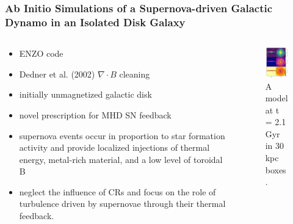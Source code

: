 \documentclass[10pt,aspectratio=169]{beamer}
\begin{document}
\begin{frame}
	\frametitle{Ab Initio Simulations of a Supernova-driven Galactic Dynamo in an Isolated Disk Galaxy \citep{2017ApJ...843..113B}}
		\begin{columns}
			\begin{column}{0.55\textwidth}
				\begin{itemize}
					\item ENZO code
					\item Dedner et al. (2002) $\nabla \cdot B$ cleaning
					\item initially unmagnetized galactic disk
					\item novel prescription for MHD SN feedback
					\item supernova events occur in proportion to star formation activity and provide localized injections of thermal energy, metal-rich material, and a low level of toroidal B
					\item neglect the influence of CRs and focus on the role of turbulence driven by supernovae through their thermal feedback.
				\end{itemize}
			\end{column}
			\begin{column}{0.48\textwidth}
			\begin{figure}
				\includegraphics[width=5cm]{./images/g80_lr.pdf}
				\caption{A model at t = 2.1	Gyr in 30 kpc boxes.}
			\end{figure}
			\end{column}
		\end{columns}
\end{frame}
\end{document}
